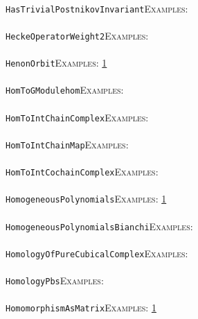 \documentclass[a4paper,11pt]{report}
\begin{document}
{{ \\
 \texttt{HasTrivialPostnikovInvariant}{\nobreakspace}{\nobreakspace}{\nobreakspace}{\nobreakspace}\textsc{Examples:} \\
 \\
 \texttt{HeckeOperatorWeight2}{\nobreakspace}{\nobreakspace}{\nobreakspace}{\nobreakspace}\textsc{Examples:} \\
 \\
 \texttt{HenonOrbit}{\nobreakspace}{\nobreakspace}{\nobreakspace}{\nobreakspace}\textsc{Examples:} \href{tutorial/chap2.html} {1}{\nobreakspace} \\
 \\
 \texttt{HomToGModule{\textunderscore}hom}{\nobreakspace}{\nobreakspace}{\nobreakspace}{\nobreakspace}\textsc{Examples:} \\
 \\
 \texttt{HomToInt{\textunderscore}ChainComplex}{\nobreakspace}{\nobreakspace}{\nobreakspace}{\nobreakspace}\textsc{Examples:} \\
 \\
 \texttt{HomToInt{\textunderscore}ChainMap}{\nobreakspace}{\nobreakspace}{\nobreakspace}{\nobreakspace}\textsc{Examples:} \\
 \\
 \texttt{HomToInt{\textunderscore}CochainComplex}{\nobreakspace}{\nobreakspace}{\nobreakspace}{\nobreakspace}\textsc{Examples:} \\
 \\
 \texttt{HomogeneousPolynomials}{\nobreakspace}{\nobreakspace}{\nobreakspace}{\nobreakspace}\textsc{Examples:} \href{tutorial/chap10.html} {1}{\nobreakspace} \\
 \\
 \texttt{HomogeneousPolynomials{\textunderscore}Bianchi}{\nobreakspace}{\nobreakspace}{\nobreakspace}{\nobreakspace}\textsc{Examples:} \\
 \\
 \texttt{HomologyOfPureCubicalComplex}{\nobreakspace}{\nobreakspace}{\nobreakspace}{\nobreakspace}\textsc{Examples:} \\
 \\
 \texttt{HomologyPbs}{\nobreakspace}{\nobreakspace}{\nobreakspace}{\nobreakspace}\textsc{Examples:} \\
 \\
 \texttt{HomomorphismAsMatrix}{\nobreakspace}{\nobreakspace}{\nobreakspace}{\nobreakspace}\textsc{Examples:} \href{tutorial/chap10.html} {1}{\nobreakspace} \\
 \\
}}
\end{document}
